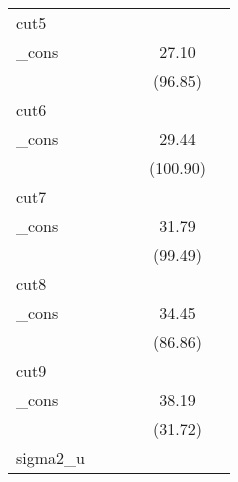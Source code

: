 {\begin{tabular}{l*{5}{c}}
\hline
cut5        &                     &                     &                     &                     &                     \\
\_cons      &                     &                     &                     &       27.10\sym{***}&                     \\
            &                     &                     &                     &     (96.85)         &                     \\
\hline
cut6        &                     &                     &                     &                     &                     \\
\_cons      &                     &                     &                     &       29.44\sym{***}&                     \\
            &                     &                     &                     &    (100.90)         &                     \\
\hline
cut7        &                     &                     &                     &                     &                     \\
\_cons      &                     &                     &                     &       31.79\sym{***}&                     \\
            &                     &                     &                     &     (99.49)         &                     \\
\hline
cut8        &                     &                     &                     &                     &                     \\
\_cons      &                     &                     &                     &       34.45\sym{***}&                     \\
            &                     &                     &                     &     (86.86)         &                     \\
\hline
cut9        &                     &                     &                     &                     &                     \\
\_cons      &                     &                     &                     &       38.19\sym{***}&                     \\
            &                     &                     &                     &     (31.72)         &                     \\
\hline
sigma2\_u    &                     &                     &                     &                     &                     \\

\end{tabular}}
